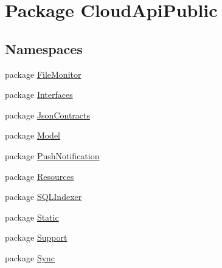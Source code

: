 \hypertarget{namespace_cloud_api_public}{\section{Package Cloud\-Api\-Public}
\label{namespace_cloud_api_public}
}
\subsection*{Namespaces}
\begin{DoxyCompactItemize}
\item 
package \hyperlink{namespace_cloud_api_public_1_1_file_monitor}{File\-Monitor}
\item 
package \hyperlink{namespace_cloud_api_public_1_1_interfaces}{Interfaces}
\item 
package \hyperlink{namespace_cloud_api_public_1_1_json_contracts}{Json\-Contracts}
\item 
package \hyperlink{namespace_cloud_api_public_1_1_model}{Model}
\item 
package \hyperlink{namespace_cloud_api_public_1_1_push_notification}{Push\-Notification}
\item 
package \hyperlink{namespace_cloud_api_public_1_1_resources}{Resources}
\item 
package \hyperlink{namespace_cloud_api_public_1_1_s_q_l_indexer}{S\-Q\-L\-Indexer}
\item 
package \hyperlink{namespace_cloud_api_public_1_1_static}{Static}
\item 
package \hyperlink{namespace_cloud_api_public_1_1_support}{Support}
\item 
package \hyperlink{namespace_cloud_api_public_1_1_sync}{Sync}
\end{DoxyCompactItemize}
